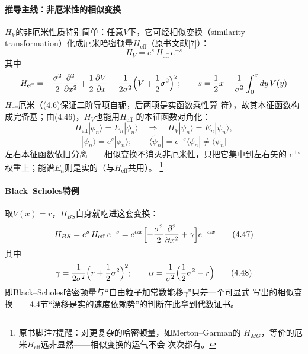 \paragraph{推导主线：非厄米性的相似变换}
$H_{V}$的非厄米性质特别简单：任意$V$下，它可经相似变换（similarity
transformation）化成厄米哈密顿量$H_{\mathrm{eff}}$（原书文献[7]）：
\begin{equation*}
H_{V}=e^{s}\,H_{\mathrm{eff}}\,e^{-s}
\tag{4.46}
\end{equation*}
其中
\begin{equation*}
H_{\mathrm{eff}}=-\frac{\sigma^{2}}{2}\frac{\partial^{2}}{\partial x^{2}}
+\frac{1}{2}\frac{\partial V}{\partial x}
+\frac{1}{2\sigma^{2}}\Bigl(V+\frac{1}{2}\sigma^{2}\Bigr)^{2}
;\qquad
s=\frac{1}{2}x-\frac{1}{\sigma^{2}}\int_{0}^{x}dy\,V(y)
\end{equation*}
$H_{\mathrm{eff}}$厄米（(4.6)保证二阶导项自轭，后两项是实函数乘性算
符），故其本征函数构成完备基；由(4.46)，$H_{V}$也能用$H_{\mathrm{eff}}$
的本征函数对角化：
\begin{equation*}
H_{\mathrm{eff}}|\phi_{n}\rangle=E_{n}|\phi_{n}\rangle
\quad\Longrightarrow\quad
H_{V}|\psi_{n}\rangle=E_{n}|\psi_{n}\rangle,
\end{equation*}
\begin{equation*}
|\psi_{n}\rangle=e^{s}|\phi_{n}\rangle
;\qquad
\langle\tilde{\psi}_{n}|=e^{-s}\langle\phi_{n}|\neq\langle\psi_{n}|
\end{equation*}
左右本征函数依旧分离——相似变换不消灭非厄米性，只把它集中到左右矢的
$e^{\pm s}$权重上；能谱$E_{n}$则是实的（与$H_{\mathrm{eff}}$共用）。
\footnote{原书脚注7提醒：对更复杂的哈密顿量，如Merton--Garman的
$H_{MG}$，等价的厄米$H_{\mathrm{eff}}$远非显然——相似变换的运气不会
次次都有。}

\paragraph{Black--Scholes特例}
取$V(x)=r$，$H_{BS}$自身就吃进这套变换：
\begin{equation*}
H_{BS}=e^{s}\,H_{\mathrm{eff}}\,e^{-s}
=e^{\alpha x}\Bigl[-\frac{\sigma^{2}}{2}
\frac{\partial^{2}}{\partial x^{2}}+\gamma\Bigr]e^{-\alpha x}
\tag{4.47}
\end{equation*}
其中
\begin{equation*}
\gamma=\frac{1}{2\sigma^{2}}\Bigl(r+\frac{1}{2}\sigma^{2}\Bigr)^{2}
;\qquad
\alpha=\frac{1}{\sigma^{2}}\Bigl(\frac{1}{2}\sigma^{2}-r\Bigr)
\tag{4.48}
\end{equation*}
即Black--Scholes哈密顿量与“自由粒子加常数能移$\gamma$”只差一个可显式
写出的相似变换——4.4节“漂移是实的速度依赖势”的判断在此拿到代数证书。

